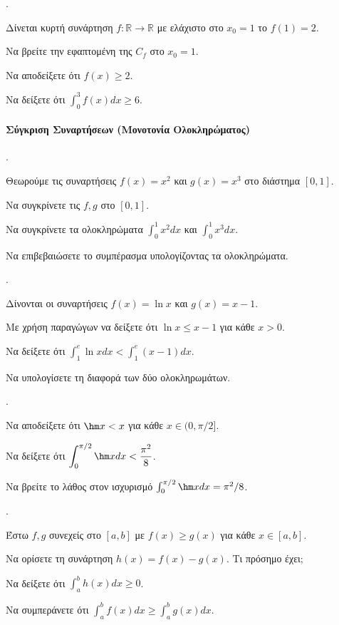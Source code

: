 \documentclass[11pt,a4paper,twocolumn]{article}
\newcounter{askhsh}
\newcommand{\askhsh}{\large\theaskhsh.\ \addtocounter{askhsh}{1}}
\begin{document}
\askhsh Δίνεται κυρτή συνάρτηση $f:\mathbb{R} \to \mathbb{R}$ με ελάχιστο στο $x_0=1$ το $f(1)=2$.
\begin{alist}
\item Να βρείτε την εφαπτομένη της $C_f$ στο $x_0=1$.
\item Να αποδείξετε ότι $f(x) \ge 2$.
\item Να δείξετε ότι $\displaystyle \int_0^3 f(x) dx \ge 6$.
\end{alist}

\paragraph{Σύγκριση Συναρτήσεων (Μονοτονία Ολοκληρώματος)}

\askhsh Θεωρούμε τις συναρτήσεις $f(x)=x^2$ και $g(x)=x^3$ στο διάστημα $[0,1]$.
\begin{alist}
\item Να συγκρίνετε τις $f, g$ στο $[0,1]$.
\item Να συγκρίνετε τα ολοκληρώματα $\displaystyle \int_0^1 x^2 dx$ και $\displaystyle \int_0^1 x^3 dx$.
\item Να επιβεβαιώσετε το συμπέρασμα υπολογίζοντας τα ολοκληρώματα.
\end{alist}

\askhsh Δίνονται οι συναρτήσεις $f(x) = \ln x$ και $g(x) = x-1$.
\begin{alist}
\item Με χρήση παραγώγων να δείξετε ότι $\ln x \le x-1$ για κάθε $x>0$.
\item Να δείξετε ότι $\displaystyle \int_1^e \ln x dx < \int_1^e (x-1) dx$.
\item Να υπολογίσετε τη διαφορά των δύο ολοκληρωμάτων.
\end{alist}

\askhsh 
\begin{alist}
\item Να αποδείξετε ότι $\hm x < x$ για κάθε $x \in (0, \pi/2]$.
\item Να δείξετε ότι $\displaystyle \int_0^{\pi/2} \hm x dx < \frac{\pi^2}{8}$.
\item Να βρείτε το λάθος στον ισχυρισμό $\int_0^{\pi/2} \hm x dx = \pi^2/8$.
\end{alist}

\askhsh Έστω $f, g$ συνεχείς στο $[a,b]$ με $f(x) \ge g(x)$ για κάθε $x \in [a,b]$.
\begin{alist}
\item Να ορίσετε τη συνάρτηση $h(x) = f(x) - g(x)$. Τι πρόσημο έχει;
\item Να δείξετε ότι $\int_a^b h(x) dx \ge 0$.
\item Να συμπεράνετε ότι $\int_a^b f(x) dx \ge \int_a^b g(x) dx$.
\end{alist}
\end{document}
